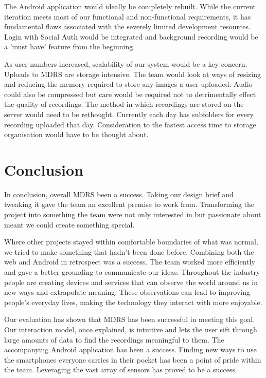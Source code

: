 \documentclass{l3proj}
\begin{document}
The Android application would ideally be completely rebuilt. While the current iteration meets most of our functional and non-functional requirements, it has fundamental flaws associated with the severely limited development resources. Login with Social Auth would be integrated and background recording would be a 'must have' feature from the beginning.

As user numbers increased, scalability of our system would be a key concern. Uploads to MDRS are storage intensive. The team would look at ways of resizing and reducing the memory required to store any images a user uploaded. Audio could also be compressed but  care would be required not to detrimentally effect the quality of recordings. The method in which recordings are stored on the server would need to be rethought. Currently each day has subfolders for every recording uploaded that day. Consideration to the fastest access time to storage organisation would have to be thought about.

\chapter{Conclusion}

In conclusion, overall MDRS been a success. Taking our design brief and tweaking it gave the team an excellent premise to work from. Transforming the project into something the team were not only interested in but passionate about meant we could create something special.

Where other projects stayed within comfortable boundaries of what was normal, we tried to make something that hadn't been done before. Combining both the web and Android in retrospect was a success. The team worked more efficiently and gave a better grounding to communicate our ideas. Throughout the industry people are creating devices and services that can observe the world around us in new ways and extrapolate meaning. These observations can lead to improving people's everyday lives, making the technology they interact with more enjoyable.

Our evaluation has shown that MDRS has been successful in meeting this goal. Our interaction model, once explained, is intuitive and lets the user sift through large amounts of data to find the recordings meaningful to them. The accompanying Android application has been a success. Finding new ways to use the smartphones everyone carries in their pocket has been a point of pride within the team. Leveraging the vast array of sensors has proved to be a success.
\end{document}
